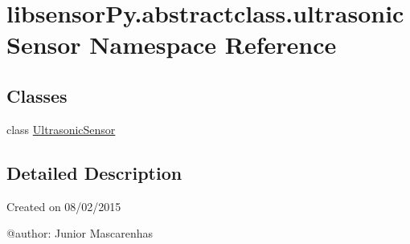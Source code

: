 \hypertarget{namespacelibsensorPy_1_1abstractclass_1_1ultrasonicSensor}{}\section{libsensor\+Py.\+abstractclass.\+ultrasonic\+Sensor Namespace Reference}
\label{namespacelibsensorPy_1_1abstractclass_1_1ultrasonicSensor}
\subsection*{Classes}
\begin{DoxyCompactItemize}
\item 
class \hyperlink{classlibsensorPy_1_1abstractclass_1_1ultrasonicSensor_1_1UltrasonicSensor}{Ultrasonic\+Sensor}
\end{DoxyCompactItemize}


\subsection{Detailed Description}
\begin{DoxyVerb}Created on 08/02/2015

@author: Junior Mascarenhas
\end{DoxyVerb}
 